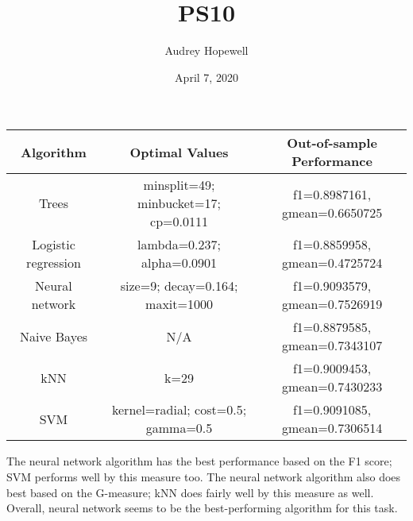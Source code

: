 \documentclass{article}
\title{PS10}
\author{Audrey Hopewell }
\date{April 7, 2020}
\begin{document}
\maketitle

\begin{center}
 \begin{tabular}{||c c c||} 
 \hline
 Algorithm & Optimal Values & Out-of-sample Performance \\ [0.1ex] 
 \hline\hline
 Trees & minsplit=49; minbucket=17; cp=0.0111 & f1=0.8987161, gmean=0.6650725  \\ 
 \hline
 Logistic regression & lambda=0.237; alpha=0.0901 & f1=0.8859958, gmean=0.4725724 \\
 \hline
 Neural network & size=9; decay=0.164; maxit=1000 & f1=0.9093579, gmean=0.7526919 \\
 \hline
 Naive Bayes & N/A & f1=0.8879585, gmean=0.7343107 \\
 \hline
 kNN & k=29 & f1=0.9009453, gmean=0.7430233 \\ 
 \hline
 SVM & kernel=radial; cost=0.5; gamma=0.5 & f1=0.9091085, gmean=0.7306514  \\ [1ex] 
 \hline
\end{tabular}
\end{center}


The neural network algorithm has the best performance based on the F1 score; SVM performs well by this measure too. The neural network algorithm also does best based on the G-measure; kNN does fairly well by this measure as well. Overall, neural network seems to be the best-performing algorithm for this task.
\end{document}

